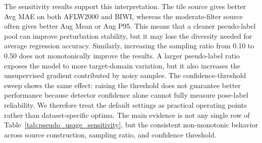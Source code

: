 \documentclass[preprint,12pt]{elsarticle}
\begin{document}
The sensitivity results support this interpretation. The tile source gives better Avg MAE on both AFLW2000 and BIWI, whereas the moderate-filter source often gives better Aug Mean or Aug P95. This means that a cleaner pseudo-label pool can improve perturbation stability, but it may lose the diversity needed for average regression accuracy. Similarly, increasing the sampling ratio from 0.10 to 0.50 does not monotonically improve the results. A larger pseudo-label ratio exposes the model to more target-domain variation, but it also increases the unsupervised gradient contributed by noisy samples. The confidence-threshold sweep shows the same effect: raising the threshold does not guarantee better performance because detector confidence alone cannot fully measure pose-label reliability. We therefore treat the default settings as practical operating points rather than dataset-specific optima. The main evidence is not any single row of Table~\ref{tab:pseudo_usage_sensitivity}, but the consistent non-monotonic behavior across source construction, sampling ratio, and confidence threshold.
\end{document}
